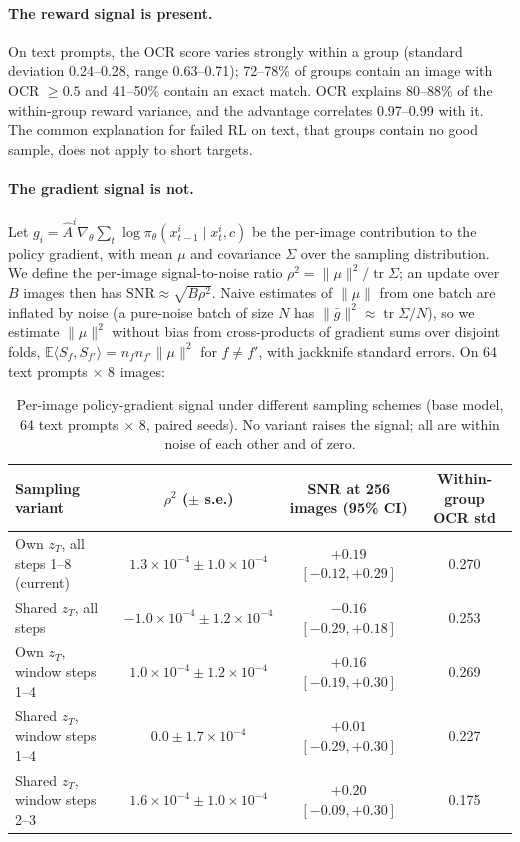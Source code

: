 \documentclass{article}
\begin{document}
\paragraph{The reward signal is present.} On text prompts, the OCR score varies strongly within a group (standard deviation
0.24--0.28, range 0.63--0.71); 72--78\% of groups contain an image with OCR $\ge0.5$ and 41--50\% contain an exact match. OCR
explains 80--88\% of the within-group reward variance, and the advantage correlates 0.97--0.99 with it. The common explanation
for failed RL on text, that groups contain no good sample, does not apply to short targets.

\paragraph{The gradient signal is not.} Let $g_i = \hat A^i\nabla_\theta\sum_t\log\pi_\theta(x^i_{t-1}\mid x^i_t,c)$ be
the per-image contribution to the policy gradient, with mean $\mu$ and covariance $\Sigma$ over the sampling distribution. We
define the per-image signal-to-noise ratio $\rho^2=\|\mu\|^2/\operatorname{tr}\Sigma$; an update over $B$ images then has
$\mathrm{SNR}\approx\sqrt{B\rho^2}$. Naive estimates of $\|\mu\|$ from one batch are inflated by noise (a pure-noise batch of
size $N$ has $\|\bar g\|^2\approx\operatorname{tr}\Sigma/N$), so we estimate $\|\mu\|^2$ without bias from cross-products of
gradient sums over disjoint folds, $\mathbb E\langle S_f,S_{f'}\rangle=n_fn_{f'}\|\mu\|^2$ for $f\neq f'$, with jackknife
standard errors. On 64 text prompts $\times$ 8 images:

\begin{table}[h]
  \caption{Per-image policy-gradient signal under different sampling schemes (base model, 64 text prompts $\times$ 8,
  paired seeds). No variant raises the signal; all are within noise of each other and of zero.}
  \label{tab:snr}
  \centering
  \small
  \begin{tabular}{lccc}
    \toprule
    Sampling variant & $\rho^2$ ($\pm$ s.e.) & SNR at 256 images (95\% CI) & Within-group OCR std \\
    \midrule
    Own $z_T$, all steps 1--8 (current) & $1.3\times10^{-4}\pm1.0\times10^{-4}$ & $+0.19$ $[-0.12,+0.29]$ & 0.270 \\
    Shared $z_T$, all steps          & $-1.0\times10^{-4}\pm1.2\times10^{-4}$ & $-0.16$ $[-0.29,+0.18]$ & 0.253 \\
    Own $z_T$, window steps 1--4     & $1.0\times10^{-4}\pm1.2\times10^{-4}$ & $+0.16$ $[-0.19,+0.30]$ & 0.269 \\
    Shared $z_T$, window steps 1--4  & $0.0\pm1.7\times10^{-4}$ & $+0.01$ $[-0.29,+0.30]$ & 0.227 \\
    Shared $z_T$, window steps 2--3  & $1.6\times10^{-4}\pm1.0\times10^{-4}$ & $+0.20$ $[-0.09,+0.30]$ & 0.175 \\
    \bottomrule
  \end{tabular}
\end{table}
\end{document}
